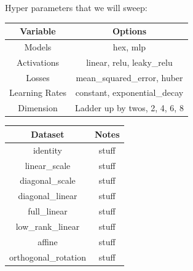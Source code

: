 Hyper parameters that we will sweep:

\begin{table}
    \centering
    \begin{tabular}{c|c}
        Variable & Options \\
        \hline
        \hline
        Models & hex, mlp \\
        \hline
        Activations & linear, relu, leaky\_relu \\
        \hline
        Losses & mean\_squared\_error, huber \\
        \hline
        Learning Rates & constant, exponential\_decay \\
        \hline
        Dimension & Ladder up by twos, 2, 4, 6, 8 \\
    \end{tabular}
    \label{tab:Benchmark A Hyper parameters}
\end{table}


\begin{table}
    \centering
    \begin{tabular}{c|c}
        Dataset & Notes \\
        \hline
        \hline
        identity & stuff \\
        \hline
        linear\_scale & stuff \\
        \hline
        diagonal\_scale & stuff \\
        \hline
        diagonal\_linear & stuff \\
        \hline
        full\_linear & stuff \\
        \hline
        low\_rank\_linear & stuff \\
        \hline
        affine & stuff \\
        \hline
        orthogonal\_rotation & stuff \\
        \hline
    \end{tabular}
\end{table}


